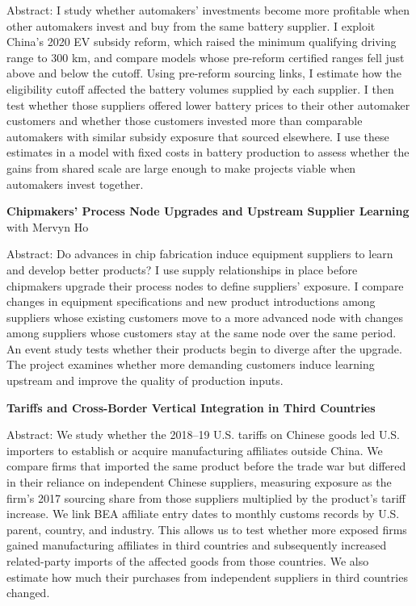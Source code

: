 \documentclass[11pt,letterpaper]{article}
\begin{document}
Abstract: I study whether automakers’ investments become more profitable when other automakers invest and buy from the same battery supplier. I exploit China’s 2020 EV subsidy reform, which raised the minimum qualifying driving range to 300 km, and compare models whose pre-reform certified ranges fell just above and below the cutoff. Using pre-reform sourcing links, I estimate how the eligibility cutoff affected the battery volumes supplied by each supplier. I then test whether those suppliers offered lower battery prices to their other automaker customers and whether those customers invested more than comparable automakers with similar subsidy exposure that sourced elsewhere. I use these estimates in a model with fixed costs in battery production to assess whether the gains from shared scale are large enough to make projects viable when automakers invest together.
\par\addvspace{15pt}\textbf{Chipmakers’ Process Node Upgrades and Upstream Supplier Learning} with Mervyn Ho\par\nopagebreak\vspace{2pt}\nopagebreak
Abstract: Do advances in chip fabrication induce equipment suppliers to learn and develop better products? I use supply relationships in place before chipmakers upgrade their process nodes to define suppliers’ exposure. I compare changes in equipment specifications and new product introductions among suppliers whose existing customers move to a more advanced node with changes among suppliers whose customers stay at the same node over the same period. An event study tests whether their products begin to diverge after the upgrade. The project examines whether more demanding customers induce learning upstream and improve the quality of production inputs.
\par\addvspace{15pt}\textbf{Tariffs and Cross-Border Vertical Integration in Third Countries}\par\nopagebreak\vspace{2pt}\nopagebreak
Abstract: We study whether the 2018–19 U.S. tariffs on Chinese goods led U.S. importers to establish or acquire manufacturing affiliates outside China. We compare firms that imported the same product before the trade war but differed in their reliance on independent Chinese suppliers, measuring exposure as the firm’s 2017 sourcing share from those suppliers multiplied by the product’s tariff increase. We link BEA affiliate entry dates to monthly customs records by U.S. parent, country, and industry. This allows us to test whether more exposed firms gained manufacturing affiliates in third countries and subsequently increased related-party imports of the affected goods from those countries. We also estimate how much their purchases from independent suppliers in third countries changed.
\end{document}
